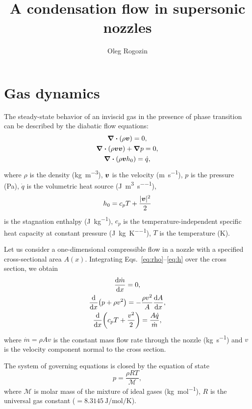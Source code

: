 \documentclass{article}
\title{A condensation flow in supersonic nozzles}
\author{Oleg Rogozin}
\newcommand{\bv}{\vb*{v}}
\begin{document}
\maketitle
\tableofcontents

\section{Gas dynamics}

The steady-state behavior of an inviscid gas in the presence of phase transition
can be described by the diabatic flow equations:
\begin{gather}
    \div(\rho\bv) = 0, \label{eq:rho}\\
    \div(\rho\bv\bv) + \grad{p} = 0, \label{eq:v}\\
    \div(\rho\bv h_0) = \dot{q}, \label{eq:h}
\end{gather}
where $\rho$ is the density (\si{\kg\per\cubic\m}), $\bv$ is the velocity (\si{\m\per\s}),
$p$ is the pressure (\si{\Pa}), $\dot{q}$ is the volumetric heat source (\si{\J\per\cubic\m\per\s}),
\begin{equation}\label{eq:h0}
    h_0 = c_pT + \frac{|\bv|^2}{2}
\end{equation}
is the stagnation enthalpy (\si{\J\per\kg}),
$c_p$ is the temperature-independent specific heat capacity at constant pressure (\si{\J\per\kg\per\K}),
$T$ is the temperature (\si{\K}).

Let us consider a one-dimensional compressible flow in a nozzle with a specified cross-sectional area $A(x)$.
Integrating Eqs.~\eqref{eq:rho}--\eqref{eq:h} over the cross section, we obtain
\begin{gather}
    \dv{\dot{m}}{x} = 0, \label{eq:continuity}\\
    \dv{x}(p + \rho v^2) = -\frac{\rho v^2}{A}\dv{A}{x}, \label{eq:momentum}\\
    \dv{x}(c_pT + \frac{v^2}{2}) = \frac{A\dot{q}}{\dot{m}}, \label{eq:energy}
\end{gather}
where $\dot{m} = \rho Av$ is the constant mass flow rate through the nozzle (\si{\kg\per\s})
and $v$ is the velocity component normal to the cross section.

The system of governing equations is closed by the equation of state
\begin{equation}\label{eq:eos}
    p = \frac{\rho RT}{\mathcal{M}},
\end{equation}
where $\mathcal{M}$ is molar mass of the mixture of ideal gases (\si{\kg\per\mol}),
$R$ is the universal gas constant ($=\SI{8.3145}{\J\per\mol\per\K}$).
\end{document}
